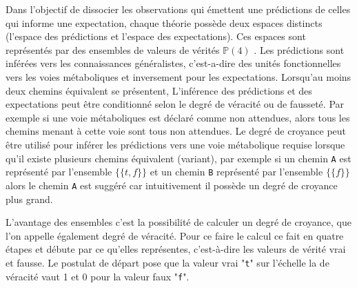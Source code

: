\begin{refsegment}
Dans l'objectif de dissocier les observations qui émettent une prédictions de celles qui informe une expectation, chaque théorie possède deux espaces distincts (l'espace des prédictions et l'espace des expectations). Ces espaces sont représentés par des ensembles de valeurs de vérités $\mathbb{P}(4)$ . Les prédictions sont inférées vers les connaissances généralistes, c'est-a-dire des unités fonctionnelles vers les voies métaboliques et inversement pour les expectations. Lorsqu'au moins deux chemins équivalent se présentent, L'inférence des prédictions et des expectations peut être conditionné selon le degré de véracité ou de fausseté. Par exemple si une voie métaboliques est déclaré comme non attendues, alors tous les chemins menant à cette voie sont tous non attendues. Le degré de croyance peut être utilisé pour inférer les prédictions vers une voie métabolique requise lorsque qu'il existe plusieurs chemins équivalent (variant), par exemple si un chemin \texttt{A} est représenté par l'ensemble $\{\{t,f\}\}$ et un chemin  \texttt{B} représenté par l'ensemble $\{\{f\}\}$ alors le chemin \texttt{A} est suggéré  car intuitivement il possède un degré de croyance plus grand.

L'avantage des ensembles c'est la possibilité de calculer un degré de croyance, que l'on appelle également degré de véracité. Pour ce faire le calcul ce fait en quatre étapes et débute par ce qu'elles représentes, c'est-à-dire les valeurs de vérité vrai et fausse. Le postulat de départ pose que la valeur vrai "\texttt{t}" sur l'échelle la de véracité vaut 1 et 0 pour la valeur faux "\texttt{f}".


\end{refsegment}
